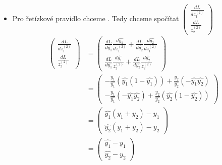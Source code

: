 \begin{itemize}

  \item  Pro řetízkové pravidlo chceme .
    Tedy chceme spočítat
    $
    \begin{pmatrix}
      \frac{dL}{d z^{(2)}_1} \\
      \frac{dL}{z^{(2)}_2}
    \end{pmatrix}
    $
    \begin{align*}
    \begin{pmatrix}
      \frac{dL}{d z^{(2)}_1} \\
      \frac{dL}{z^{(2)}_2}
    \end{pmatrix}
    &=
    \begin{pmatrix}
      \frac{dL}{d\hat{y_1}}\frac{d\hat{y_1}}{d z^{(2)}_1} + \frac{dL}{d\hat{y_2}}\frac{d\hat{y_2}}{d z^{(2)}_1} \\
      \frac{dL}{d\hat{y_1}}\frac{d\hat{y_1}}{z^{(2)}_2} + \frac{dL}{d\hat{y_2}}\frac{d\hat{y_2}}{z^{(2)}_2}
    \end{pmatrix} \\
    &=
    \begin{pmatrix}
      -\frac{y_1}{\hat{y_1}} \left( \hat{y_1}(1 - \hat{y_1}) \right) + \frac{y_2}{\hat{y_2}} \left( - \hat{y_1}\hat{y_2} \right) \\
      -\frac{y_1}{\hat{y_1}} \left( - \hat{y_1}\hat{y_2} \right) + \frac{y_2}{\hat{y_2}} \left( \hat{y_2}(1 - \hat{y_2}) \right)
    \end{pmatrix} \\
    &=
    \begin{pmatrix}
      \hat{y_1}(y_1 + y_2) - y_1 \\
      \hat{y_2}(y_1 + y_2) - y_2 
    \end{pmatrix} \tag{$y_1 + y_2 = 1$ prst. distrib.} \\
    &=
    \begin{pmatrix}
      \hat{y_1} - y_1 \\
      \hat{y_2} - y_2 
    \end{pmatrix}
    \end{align*}


\end{itemize}
